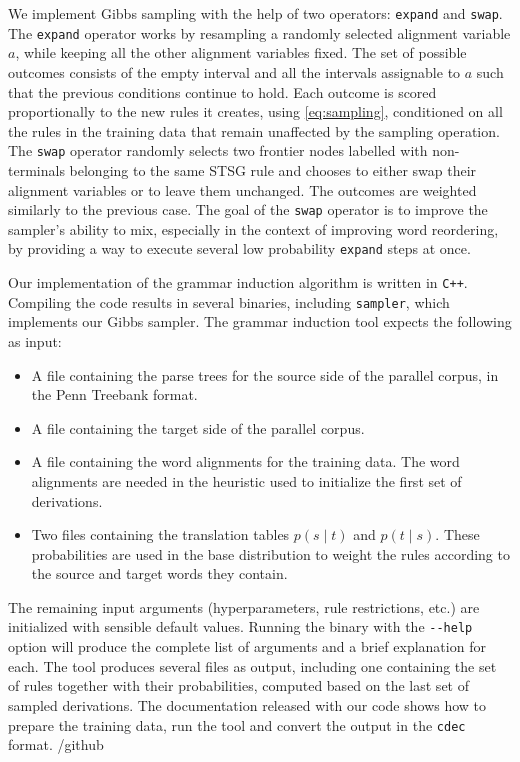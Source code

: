 \documentclass[nofonts]{pbml} %
\begin{document}
We implement Gibbs sampling with the help of two operators: \texttt{expand} and \texttt{swap}. The \texttt{expand} operator works by resampling a randomly selected alignment variable $a$, while keeping all the other alignment variables fixed. The set of possible outcomes consists of the empty interval and all the intervals assignable to $a$ such that the previous conditions continue to hold. Each outcome is scored proportionally to the new rules it creates,  using \autoref{eq:sampling}, conditioned on all the rules in the training data that remain unaffected by the sampling operation. The \texttt{swap} operator randomly selects two frontier nodes labelled with non-terminals belonging to the same STSG rule and chooses to either swap their alignment variables or to leave them unchanged. The outcomes are weighted similarly to the previous case. The goal of the \texttt{swap} operator is to improve the sampler's ability to mix, especially in the context of improving word reordering, by providing a way to execute several low probability \texttt{expand} steps at once.

Our implementation of the grammar induction algorithm is written in \texttt{C++}. Compiling the code results in several binaries, including \texttt{sampler}, which implements our Gibbs sampler. The grammar induction tool expects the following as input:
\begin{itemize}
\item A file containing the parse trees for the source side of the parallel corpus, in the Penn Treebank format.
\item A file containing the target side of the parallel corpus.
\item A file containing the word alignments for the training data. The word alignments are needed in the heuristic \citep{Galley2004} used to initialize the first set of derivations.
\item Two files containing the translation tables $p(s \mid t)$ and $p(t \mid s)$. These probabilities are used in the base distribution to weight the rules according to the source and target words they contain.
\end{itemize}
The remaining input arguments (hyperparameters, rule restrictions, etc.) are initialized with sensible default values. Running the binary with the \texttt{-{}-help} option will produce the complete list of arguments and a brief explanation for each. The tool produces several files as output, including one containing the set of rules together with their probabilities, computed based on the last set of sampled derivations. The documentation released with our code shows how to prepare the training data, run the tool and convert the output in the \texttt{cdec} format.
/github
\end{document}
